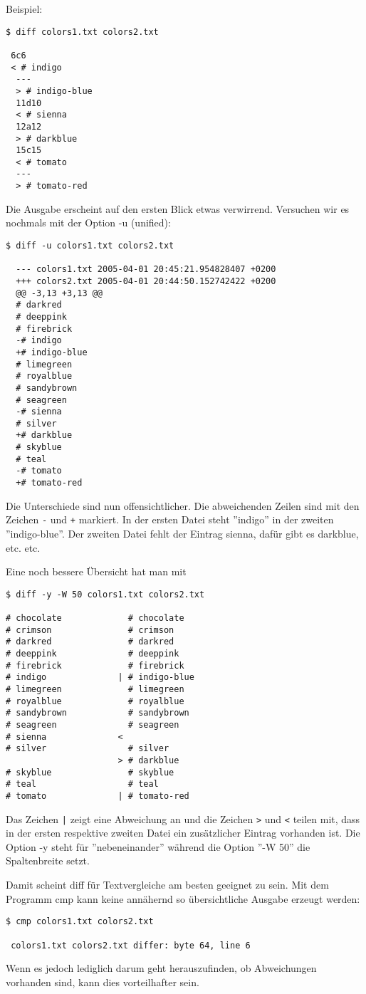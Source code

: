 \newslide
Beispiel:
\begin{lstlisting}[basicstyle=\small]
$ diff colors1.txt colors2.txt

 6c6
 < # indigo
  ---
  > # indigo-blue
  11d10
  < # sienna
  12a12
  > # darkblue
  15c15
  < # tomato
  ---
  > # tomato-red
\end{lstlisting}
\newslide
Die Ausgabe erscheint auf den ersten Blick etwas verwirrend.
Versuchen wir es nochmals mit der Option -u (unified):
\begin{lstlisting}
$ diff -u colors1.txt colors2.txt

  --- colors1.txt 2005-04-01 20:45:21.954828407 +0200
  +++ colors2.txt 2005-04-01 20:44:50.152742422 +0200
  @@ -3,13 +3,13 @@
  # darkred
  # deeppink
  # firebrick
  -# indigo
  +# indigo-blue
  # limegreen
  # royalblue
  # sandybrown
  # seagreen
  -# sienna
  # silver
  +# darkblue
  # skyblue
  # teal
  -# tomato
  +# tomato-red
\end{lstlisting}
Die Unterschiede sind nun offensichtlicher. Die abweichenden
Zeilen sind mit den Zeichen \verb+-+ und \verb|+| markiert.
In der ersten Datei steht ''indigo''
in der zweiten ''indigo-blue''. Der zweiten Datei fehlt der Eintrag
sienna, dafür gibt es darkblue, etc. etc.

\newslide
Eine noch bessere Übersicht hat man mit
\begin{lstlisting}
$ diff -y -W 50 colors1.txt colors2.txt

# chocolate             # chocolate
# crimson               # crimson
# darkred               # darkred
# deeppink              # deeppink
# firebrick             # firebrick
# indigo              | # indigo-blue
# limegreen             # limegreen
# royalblue             # royalblue
# sandybrown            # sandybrown
# seagreen              # seagreen
# sienna              <
# silver                # silver
                      > # darkblue
# skyblue               # skyblue
# teal                  # teal
# tomato              | # tomato-red
\end{lstlisting}
Das Zeichen \verb+|+ zeigt eine Abweichung an und die Zeichen
\verb+>+ und  \verb+<+ teilen mit, dass in der ersten
respektive zweiten Datei ein zusätzlicher
Eintrag vorhanden ist.
Die Option -y
steht für ''nebeneinander'' während die Option ''-W 50''
die Spaltenbreite setzt.

\newslide
Damit scheint diff für Textvergleiche am besten geeignet zu sein.
Mit dem Programm cmp kann keine annähernd so übersichtliche
Ausgabe erzeugt werden:
\begin{lstlisting}
$ cmp colors1.txt colors2.txt

 colors1.txt colors2.txt differ: byte 64, line 6
\end{lstlisting}
Wenn es jedoch lediglich darum geht herauszufinden, ob
Abweichungen vorhanden sind, kann dies vorteilhafter sein.

